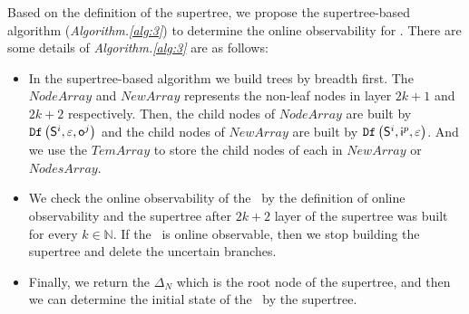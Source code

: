 Based on the definition of the supertree, we propose the supertree-based algorithm ({\em Algorithm.\ref{alg:3}}) to determine the online observability for \BCNs. There are some details of {\em Algorithm.\ref{alg:3}} are as follows:
\begin{itemize}
\item In the supertree-based algorithm we build trees by breadth first. The $NodeArray$ and $NewArray$ represents the non-leaf nodes in layer $2k+1$ and $2k+2$ respectively. Then, the child nodes of $NodeArray$ are built by ${\tt Df}\left(\mathsf{S}^i,\varepsilon, \mathsf{o}^j\right)$ and the child nodes of $NewArray$ are built by ${\tt Df}\left(\mathsf{S}^i,\mathsf{i}^p,\varepsilon\right)$. And we use the $TemArray$ to store the child nodes of each in $NewArray$ or $NodesArray$.
\item We check the online observability of the \BCN\ by the definition of online observability and the supertree after $2k+2$ layer of the supertree was built for every $k\in  \mathbb{N}$. If the \BCN\ is online observable, then we stop building the supertree and delete the uncertain branches. 
\item Finally, we return the $\Delta_N$ which is the root node of the supertree, and then we can determine the initial state of the \BCN\ by the supertree.
 \end{itemize}
